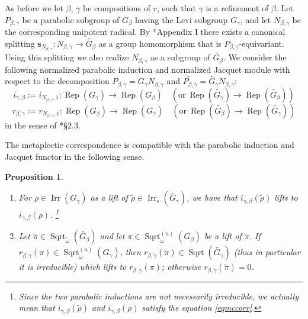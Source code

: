 \documentclass{amsart}
\numberwithin{equation}{section}
\newtheorem{proposition}[theorem]{\bf{Proposition}}
\newcommand{\mrirr}{\operatorname{Irr}}
\newcommand{\mrrep}{\operatorname{Rep}}
\newcommand{\mrsqrt}{\operatorname{Sqrt}}
\newcommand{\bs}[1]{\boldsymbol{#1}}
\newcommand{\wt}[1]{\widetilde{#1}}
\begin{document}
	As before we let $\beta$, $\gamma$ be compositions of $r$, such that $\gamma$ is a refinement of $\beta$. Let $P_{\beta,\gamma}$ be a parabolic subgroup of $G_{\beta}$ having the Levi subgroup $G_{\gamma}$, and let $N_{\beta,\gamma}$ be the corresponding unipotent radical. By \cite{moeglin1995spectral}*{Appendix I} there exists a canonical splitting $\bs{s}_{N_{\beta,\gamma}}:N_{\beta,\gamma}\rightarrow \wt{G_{\beta}}$ as a group homomorphism that is $P_{\beta,\gamma}$-equivariant. Using this splitting we also realize $N_{\beta,\gamma}$ as a subgroup of $\wt{G_{\beta}}$. We consider the following normalized parabolic induction and normalized Jacquet module with respect to the decomposition $P_{\beta,\gamma}=G_{\gamma}N_{\beta,\gamma}$ and $\wt{P_{\beta,\gamma}}=\wt{G_{\gamma}}N_{\beta,\gamma}$:
	$$i_{\gamma,\beta}:=i_{N_{\beta,\gamma},1}:\mrrep(G_{\gamma})\rightarrow\mrrep(G_{\beta})\quad(\text{or}\ \mrrep(\wt{G_{\gamma}})\rightarrow\mrrep(\wt{G_{\beta}})) $$
	$$r_{\beta,\gamma}:=r_{N_{\beta,\gamma},1}:\mrrep(G_{\beta})\rightarrow\mrrep(G_{\gamma})\quad(\text{or}\ \mrrep(\wt{G_{\beta}})\rightarrow\mrrep(\wt{G_{\gamma}}))$$
	in the sense of \cite{bernstein1977induced}*{\S 2.3}.
	
	The metaplectic correspondence is compatible with the parabolic induction and Jacquet functor in the following sense.
	
	\begin{proposition}\label{propmcindres}
		
		\begin{enumerate}
			\item For $\rho\in\mrirr(G_{\gamma})$ as a lift of $\wt{\rho}\in\mrirr_{\epsilon}(\wt{G_{\gamma}})$, we have that $i_{\gamma,\beta}(\wt{\rho})$ lifts to $i_{\gamma,\beta}(\rho)$. \footnote{Since the two parabolic inductions are not necessarily irreducible, we actually mean that $i_{\gamma,\beta}(\wt{\rho})$ and $i_{\gamma,\beta}(\rho)$ satisfy the equation \eqref{eqmccorr}.}
			
			\item Let $\wt{\pi}\in\mrsqrt_{\wt{\omega}}(\wt{G_{\beta}})$ and let $\pi\in\mrsqrt_{\omega}^{(n)}(G_{\beta})$ be a lift of $\wt{\pi}$. If $r_{\beta,\gamma}(\pi)\in\mrsqrt^{(n)}_{\omega}(G_{\gamma})$, then $r_{\beta,\gamma}(\wt{\pi})\in\mrsqrt(\wt{G_{\gamma}})$ (thus in particular it is irreducible) which lifts to $r_{\beta,\gamma}(\pi)$; otherwise $r_{\beta,\gamma}(\wt{\pi})=0$.
		\end{enumerate}
		
	\end{proposition}
	
\end{document}

